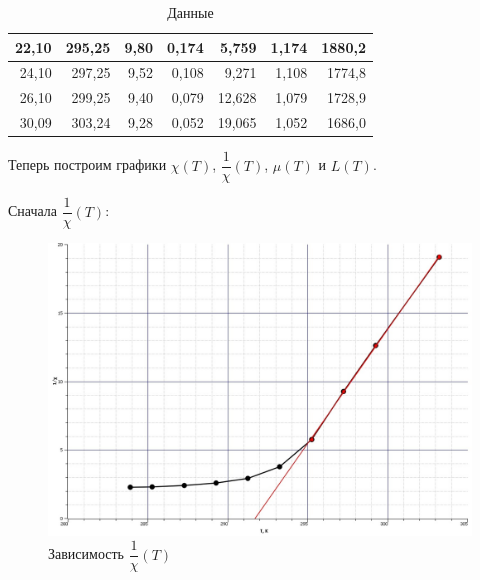 \documentclass[a4paper,12pt]{article} %
\begin{document}
\begin{table}[h!]
\begin{tabular}{|r|r|r|r|r|r|r|}
		22,10                                 & 295,25                      & 9,80                             & 0,174                      & 5,759                                 & 1,174                      & 1880,2                         \\ \hline
		24,10                                 & 297,25                      & 9,52                             & 0,108                      & 9,271                                 & 1,108                      & 1774,8                         \\ \hline
		26,10                                 & 299,25                      & 9,40                             & 0,079                      & 12,628                                & 1,079                      & 1728,9                         \\ \hline
		30,09                                 & 303,24                      & 9,28                             & 0,052                      & 19,065                                & 1,052                      & 1686,0                         \\ \hline
	\end{tabular}
\caption{Данные}
\end{table}

\newpage

Теперь построим графики $\chi (T)$, $\dfrac{1}{\chi}(T)$, $\mu (T)$ и $L(T)$.

Сначала $\dfrac{1}{\chi}(T)$:

\begin{figure}[h!]
	\centering
	\includegraphics[scale=0.6]{Pictures/recip_chi(T).jpg}
	\caption{Зависимость $\dfrac{1}{\chi}(T) $}
\end{figure}
\end{document}
